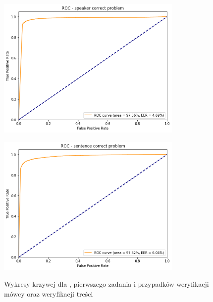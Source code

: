 \begin{figure}[H]
    \centering
    \begin{minipage}{.5\textwidth}
        \centering
        \includegraphics[width=0.8\textwidth]{images/4_3_gmm_roc_speaker}
        \label{fig:4_3_gmm_roc_speaker}
    \end{minipage}%
    \begin{minipage}{.5\textwidth}
        \centering
        \includegraphics[width=0.8\textwidth]{images/4_3_gmm_roc_sentence}
        \label{fig:4_3_gmm_roc_sentence}
    \end{minipage}
    \caption{Wykresy krzywej  dla , pierwszego zadania  i przypadków weryfikacji mówcy oraz weryfikacji treści}
\end{figure}

